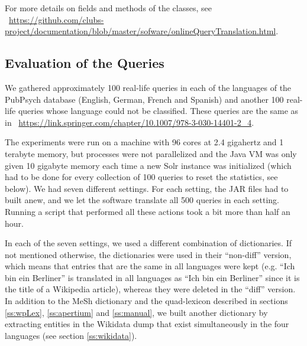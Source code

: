 \documentclass[a4paper,11pt]{article}
\begin{document}
	For more details on fields and methods of the classes, see  ~\url{https://github.com/clubs-project/documentation/blob/master/sofware/onlineQueryTranslation.html}.
	
	\subsection{Evaluation of the Queries}
	\label{ss:evaluation}
	We gathered approximately 100 real-life queries in each of the languages of the PubPsych database (English, German, French and Spanish) and another 100 real-life queries whose language could not be classified. These queries are the same as in ~\url{https://link.springer.com/chapter/10.1007/978-3-030-14401-2_4}.
	
	The experiments were run on a machine with 96 cores at 2.4 gigahertz and 1 terabyte memory, but processes were not parallelized and the Java VM was only given 10 gigabyte memory each time a new Solr instance was initialized (which had to be done for every collection of 100 queries to reset the statistics, see below). We had seven different settings. For each setting, the JAR files had to built anew, and we let the software translate all 500 queries in each setting. Running a script that performed all these actions took a bit more than half an hour. 
	
	In each of the seven settings, we used a different combination of dictionaries. If not mentioned otherwise, the dictionaries were used in their ``non-diff'' version, which means that entries that are the same in all languages were kept (e.g. ``Ich bin ein Berliner'' is translated in all languages as ``Ich bin ein Berliner'' since it is the title of a Wikipedia article), whereas they were deleted in the ``diff'' version. In addition to the MeSh dictionary and the quad-lexicon described in sections \ref{ss:wpLex}, \ref{ss:apertium}
	and \ref{ss:manual}, we built another dictionary by extracting entities in the Wikidata dump that exist simultaneously in the four languages (see section \ref{ss:wikidata}).
	
\end{document}
